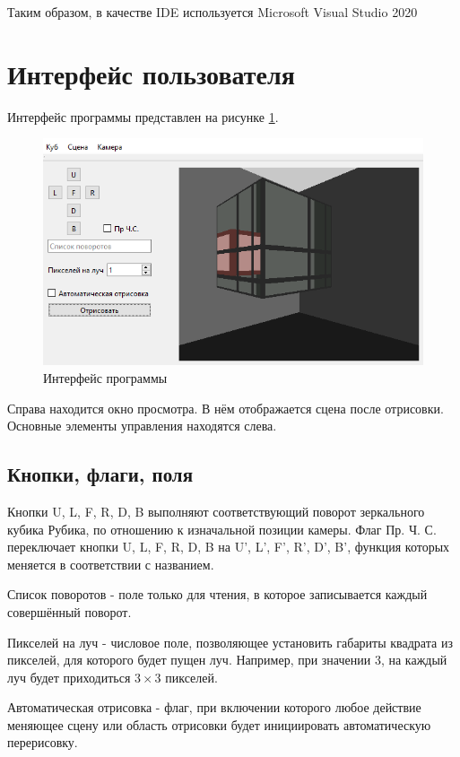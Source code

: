 \documentclass[a4paper, 14pt]{report}
\begin{document}
	Таким образом, в качестве IDE используется Microsoft Visual Studio 2020
	
	\section{Интерфейс пользователя}
	Интерфейс программы представлен на рисунке \ref{fig:interface}.
	
	\begin{figure}[ht]
		\centering
		\includegraphics[width=1\linewidth]{interface}
		\caption{Интерфейс программы}
		\label{fig:interface}
	\end{figure}

	Справа находится окно просмотра. В нём отображается сцена после отрисовки. Основные элементы управления находятся слева.
	
	\subsection{Кнопки, флаги, поля}
	Кнопки U, L, F, R, D, B выполняют соответствующий поворот зеркального кубика Рубика, по отношению к изначальной позиции камеры. Флаг Пр. Ч. С. переключает кнопки U, L, F, R, D, B на U', L', F', R', D', B', функция которых меняется в соответствии с названием.
	
	Список поворотов - поле только для чтения, в которое записывается каждый совершённый поворот.
	
	Пикселей на луч - числовое поле, позволяющее установить габариты квадрата из пикселей, для которого будет пущен луч. Например, при значении 3, на каждый луч будет приходиться $3\times 3$ пикселей.
	
	Автоматическая отрисовка - флаг, при включении которого любое действие меняющее сцену или область отрисовки будет инициировать автоматическую перерисовку.
	
\end{document}
